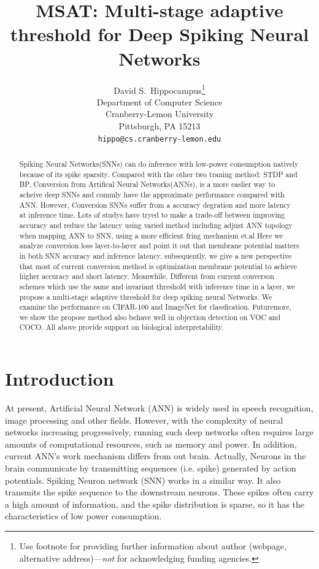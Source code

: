 \documentclass{article}
\title{MSAT: Multi-stage adaptive threshold for Deep Spiking Neural Networks}
\author{%
  David S.~Hippocampus\thanks{Use footnote for providing further information
    about author (webpage, alternative address)---\emph{not} for acknowledging
    funding agencies.} \\
  Department of Computer Science\\
  Cranberry-Lemon University\\
  Pittsburgh, PA 15213 \\
  \texttt{hippo@cs.cranberry-lemon.edu} \\
}
\begin{document}
\maketitle


\begin{abstract}
  Spiking Neural Networks(SNNs) can do inference with low-power consumption natively because of its spike sparsity.
  Compared with the other two traning method: STDP and BP, Conversion from Artifical Neural Networks(ANNs), is a more easlier way to acheive deep SNNs and commly have the approximate performance compared with ANN.
  However, Conversion SNNs suffer from a accuracy degration and more latency at inference time. Lots of studys have tryed to make a trade-off between improving accuracy and reduce the latency using varied method including adjust ANN topology
  when mapping ANN to SNN, using a more efficient fring mechanism et.al Here we analyze conversion loss layer-to-layer and point it out that membrane potential matters in both SNN accuracy and inference latency. 
  subsequently, we give a new perspective that most of current conversion method is optimization membrane potential to achieve higher accuracy and short latency.
  Meanwhile, Different from current converson schemes which use the same and invariant threshold with inference time in a layer, we propose a multi-stage adaptive threshold for deep spiking neural Networks.
  We examine the performance on CIFAR-100 and ImageNet for classfication. Futuremore, we show the propose method also behave well in objection detection on VOC and COCO. All above provide support  on biological interpretability.
\end{abstract}


\section{Introduction}

At present, Artificial Neural Network (ANN) is widely used in speech recognition, image processing and other fields.
However, with the complexity of neural
networks increasing progressively, running such deep networks
often requires large amounts of computational resources, such
as memory and power. In addition, current ANN's work mechanism differs from out brain. Actually, Neurons in the brain communicate by transmitting sequences (i.e. spike) generated by action potentials.  
Spiking Neuron network (SNN) works in a similar way. It also transmits the spike sequence to the downstream neurons. These spikes often carry a high amount of information, and the spike distribution is sparse, so it has the characteristics of low power consumption.  
\end{document}
